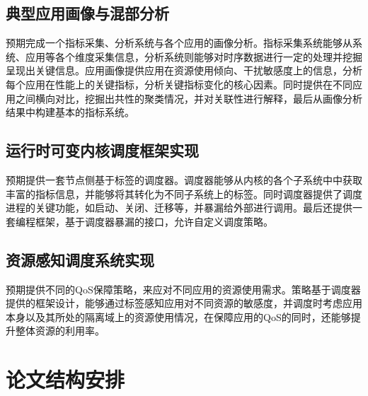 \subsection{典型应用画像与混部分析}

预期完成一个指标采集、分析系统与各个应用的画像分析。指标采集系统能够从系统、应用等各个维度采集信息，分析系统则能够对时序数据进行一定的处理并挖掘呈现出关键信息。应用画像提供应用在资源使用倾向、干扰敏感度上的信息，分析每个应用在性能上的关键指标，分析关键指标变化的核心因素。同时提供在不同应用之间横向对比，挖掘出共性的聚类情况，并对关联性进行解释，最后从画像分析结果中构建基本的指标系统。

\subsection{运行时可变内核调度框架实现}

预期提供一套节点侧基于标签的调度器。调度器能够从内核的各个子系统中中获取丰富的指标信息，并能够将其转化为不同子系统上的标签。同时调度器提供了调度进程的关键功能，如启动、关闭、迁移等，并暴漏给外部进行调用。最后还提供一套编程框架，基于调度器暴漏的接口，允许自定义调度策略。

\subsection{资源感知调度系统实现}

预期提供不同的QoS保障策略，来应对不同应用的资源使用需求。策略基于调度器提供的框架设计，能够通过标签感知应用对不同资源的敏感度，并调度时考虑应用本身以及其所处的隔离域上的资源使用情况，在保障应用的QoS的同时，还能够提升整体资源的利用率。

\section{论文结构安排}
